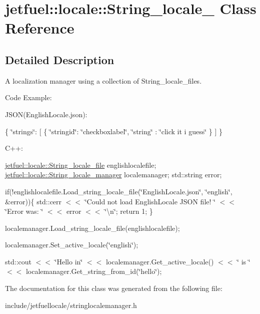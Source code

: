 \hypertarget{classjetfuel_1_1locale_1_1String__locale__}{}\section{jetfuel\+:\+:locale\+:\+:String\+\_\+locale\+\_\+ Class Reference}
\label{classjetfuel_1_1locale_1_1String__locale__}


\subsection{Detailed Description}
A localization manager using a collection of String\+\_\+locale\+\_\+files.

Code Example\+:

J\+S\+ON(English\+Locale.\+json)\+:

\{ \char`\"{}strings\char`\"{}\+: \mbox{[} \{ \char`\"{}stringid\char`\"{}\+: \char`\"{}checkboxlabel\char`\"{}, \char`\"{}string\char`\"{} \+: \char`\"{}click it i guess\char`\"{} \} \mbox{]} \}

C++\+:

\hyperlink{classjetfuel_1_1locale_1_1String__locale__file}{jetfuel\+::locale\+::\+String\+\_\+locale\+\_\+file} englishlocalefile; \hyperlink{classjetfuel_1_1locale_1_1String__locale__manager}{jetfuel\+::locale\+::\+String\+\_\+locale\+\_\+manager} localemanager; std\+::string error;

if(!englishlocalefile.Load\+\_\+string\+\_\+locale\+\_\+file(\char`\"{}\+English\+Locale.\+json\char`\"{}, \char`\"{}english\char`\"{}, \&error))\{ std\+::cerr $<$$<$ \char`\"{}\+Could not load English\+Locale J\+S\+O\+N file! \char`\"{} $<$$<$ \char`\"{}\+Error was\+: \char`\"{} $<$$<$ error $<$$<$ \char`\"{}\textbackslash{}n\char`\"{}; return 1; \}

localemanager.\+Load\+\_\+string\+\_\+locale\+\_\+file(englishlocalefile);

localemanager.\+Set\+\_\+active\+\_\+locale(\char`\"{}english\char`\"{});

std\+::cout $<$$<$ \char`\"{}\+Hello in\char`\"{} $<$$<$ localemanager.\+Get\+\_\+active\+\_\+locale() $<$$<$ \char`\"{} is \char`\"{} $<$$<$ localemanager.\+Get\+\_\+string\+\_\+from\+\_\+id(\char`\"{}hello\char`\"{}); 

The documentation for this class was generated from the following file\+:\begin{DoxyCompactItemize}
\item 
include/jetfuellocale/stringlocalemanager.\+h\end{DoxyCompactItemize}
